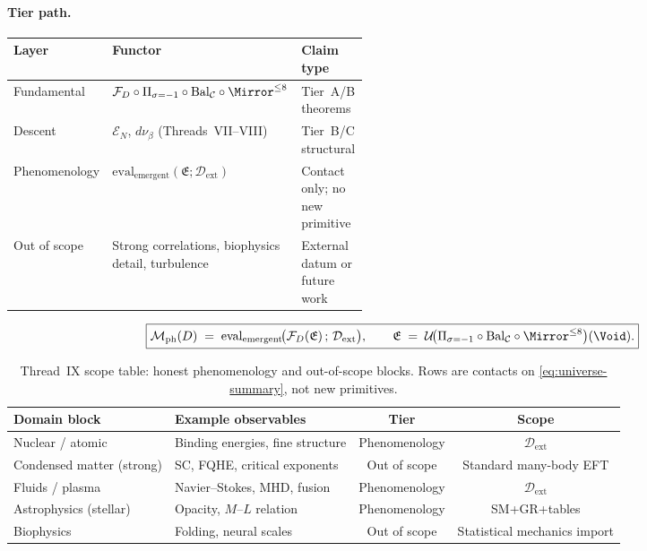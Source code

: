 \paragraph{Tier path.}
\begin{center}
\small
\renewcommand{\arraystretch}{1.1}
\begin{tabular}{@{}llp{0.46\linewidth}@{}}
\toprule
\textbf{Layer} & \textbf{Functor} & \textbf{Claim type} \\
\midrule
Fundamental &
  $\mathcal{F}_D\circ\Pi_{\sigma=-1}\circ\mathrm{Bal}_{\mathcal{C}}\circ\Mirror^{\leq 8}$ &
  Tier~A/B theorems \\
Descent &
  $\mathcal{E}_N$, $d\nu_\beta$ (Threads~VII--VIII) &
  Tier~B/C structural \\
Phenomenology &
  $\mathrm{eval}_{\mathrm{emergent}}(\mathfrak{E};\mathcal{D}_{\mathrm{ext}})$ &
  Contact only; no new primitive \\
Out of scope &
  Strong correlations, biophysics detail, turbulence &
  External datum or future work \\
\bottomrule
\end{tabular}
\end{center}

\begin{equation}\label{eq:thread-9-box}
  \boxed{%
  \mathcal{M}_{\mathrm{ph}}(D)
  \;=\;
  \mathrm{eval}_{\mathrm{emergent}}\!\bigl(
    \mathcal{F}_D(\mathfrak{E})\,;\,
    \mathcal{D}_{\mathrm{ext}}
  \bigr),
  \qquad
  \mathfrak{E}
  \;=\;
  \mathcal{U}\!\bigl(
    \Pi_{\sigma=-1}\circ\mathrm{Bal}_{\mathcal{C}}\circ\Mirror^{\leq 8}
  \bigr)(\Void).}
\end{equation}

\begin{table}[ht]
\centering
\small
\renewcommand{\arraystretch}{1.08}
\begin{tabular}{@{}llcc@{}}
\toprule
\textbf{Domain block} & \textbf{Example observables} &
\textbf{Tier} & \textbf{Scope} \\
\midrule
Nuclear / atomic &
  Binding energies, fine structure &
  Phenomenology &
  $\mathcal{D}_{\mathrm{ext}}$ \\
Condensed matter (strong) &
  SC, FQHE, critical exponents &
  Out of scope &
  Standard many-body EFT \\
Fluids / plasma &
  Navier--Stokes, MHD, fusion &
  Phenomenology &
  $\mathcal{D}_{\mathrm{ext}}$ \\
Astrophysics (stellar) &
  Opacity, $M$--$L$ relation &
  Phenomenology &
  SM+GR+tables \\
Biophysics &
  Folding, neural scales &
  Out of scope &
  Statistical mechanics import \\
\bottomrule
\end{tabular}
\caption{Thread~IX scope table: honest phenomenology and out-of-scope blocks.
Rows are contacts on \eqref{eq:universe-summary}, not new primitives.}
\label{tab:thread-9-scope}
\end{table}

